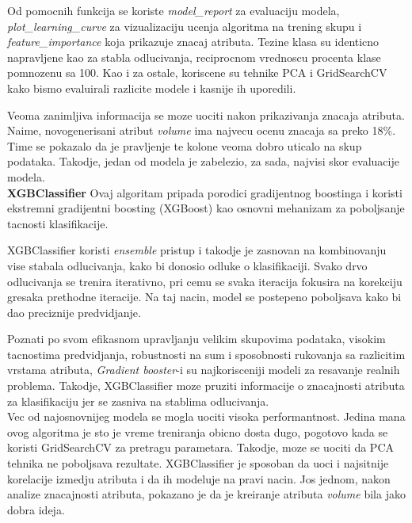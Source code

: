 \documentclass[10pt]{article}
\begin{document}
Od pomocnih funkcija se koriste \textit{model\_report} za evaluaciju modela,\\ \textit{plot\_learning\_curve} za vizualizaciju ucenja algoritma na trening skupu i \textit{feature\_importance} koja prikazuje znacaj atributa. Tezine klasa su identicno napravljene kao za stabla odlucivanja, reciprocnom vrednoscu procenta klase pomnozenu sa 100. Kao i za ostale, koriscene su tehnike PCA i GridSearchCV kako bismo evaluirali razlicite modele i kasnije ih uporedili.

Veoma zanimljiva informacija se moze uociti nakon prikazivanja znacaja atributa. Naime, novogenerisani atribut \textit{volume} ima najvecu ocenu znacaja sa preko 18\%. Time se pokazalo da je pravljenje te kolone veoma dobro uticalo na skup podataka. Takodje, jedan od modela je zabelezio, za sada, najvisi skor evaluacije modela.\\

\textbf{XGBClassifier}
Ovaj algoritam pripada porodici gradijentnog boostinga i koristi ekstremni gradijentni boosting (XGBoost) kao osnovni mehanizam za poboljsanje tacnosti klasifikacije.

XGBClassifier koristi \textit{ensemble} pristup i takodje je zasnovan na kombinovanju vise stabala odlucivanja, kako bi donosio odluke o klasifikaciji. Svako drvo odlucivanja se trenira iterativno, pri cemu se svaka iteracija fokusira na korekciju gresaka prethodne iteracije. Na taj nacin, model se postepeno poboljsava kako bi dao preciznije predvidjanje.

Poznati po svom efikasnom upravljanju velikim skupovima podataka, visokim tacnostima predvidjanja, robustnosti na sum i sposobnosti rukovanja sa razlicitim vrstama atributa, \textit{Gradient booster}-i su najkorisceniji modeli za resavanje realnih problema. Takodje, XGBClassifier moze pruziti informacije o znacajnosti atributa za klasifikaciju jer se zasniva na stablima odlucivanja.\\


Vec od najosnovnijeg modela se mogla uociti visoka performantnost. Jedina mana ovog algoritma je sto je vreme treniranja obicno dosta dugo, pogotovo kada se koristi GridSearchCV za pretragu parametara. Takodje, moze se uociti da PCA tehnika ne poboljsava rezultate. XGBClassifier je sposoban da uoci i najsitnije korelacije izmedju atributa i da ih modeluje na pravi nacin. Jos jednom, nakon analize znacajnosti atributa, pokazano je da je kreiranje atributa \textit{volume} bila jako dobra ideja.


\newpage
\end{document}
